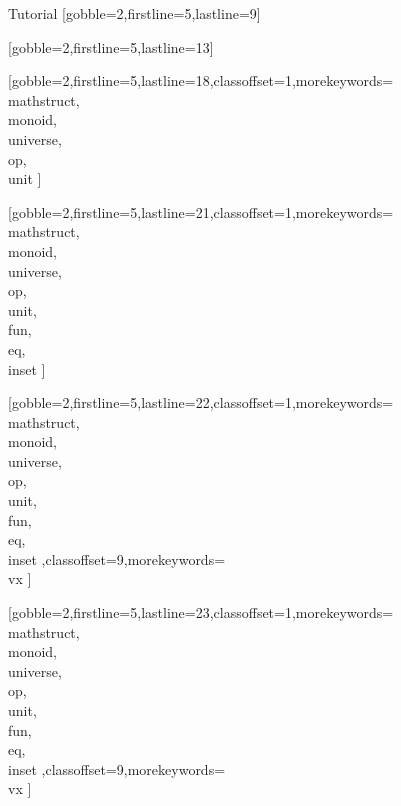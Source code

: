 \documentclass{stex}
\begin{document}
  \begin{sfragment}{Tutorial}
    [gobble=2,firstline=5,lastline=9]

    [gobble=2,firstline=5,lastline=13]

    [gobble=2,firstline=5,lastline=18,classoffset=1,morekeywords={
    \\mathstruct,\\monoid,\\universe,\\op,\\unit
    }]

    [gobble=2,firstline=5,lastline=21,classoffset=1,morekeywords={
    \\mathstruct,\\monoid,\\universe,\\op,\\unit,\\fun,\\eq,\\inset
    }]

    [gobble=2,firstline=5,lastline=22,classoffset=1,morekeywords={
    \\mathstruct,\\monoid,\\universe,\\op,\\unit,\\fun,\\eq,\\inset
    },classoffset=9,morekeywords={
      \\vx
    }]

    [gobble=2,firstline=5,lastline=23,classoffset=1,morekeywords={
    \\mathstruct,\\monoid,\\universe,\\op,\\unit,\\fun,\\eq,\\inset
    },classoffset=9,morekeywords={
      \\vx
    }]


\end{sfragment}
\end{document}
